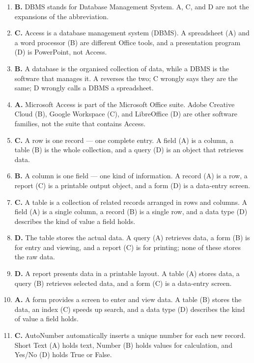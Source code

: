 \begin{enumerate}[label=\textbf{Q\arabic*.}, leftmargin=*]
\item \textbf{B.} DBMS stands for Database Management System. A, C, and D are
  not the expansions of the abbreviation.
\item \textbf{C.} Access is a database management system (DBMS). A
  spreadsheet (A) and a word processor (B) are different Office tools, and a
  presentation program (D) is PowerPoint, not Access.
\item \textbf{B.} A database is the organised collection of data, while a
  DBMS is the software that manages it. A reverses the two; C wrongly says
  they are the same; D wrongly calls a DBMS a spreadsheet.
\item \textbf{A.} Microsoft Access is part of the Microsoft Office suite.
  Adobe Creative Cloud (B), Google Workspace (C), and LibreOffice (D) are
  other software families, not the suite that contains Access.
\item \textbf{C.} A row is one record --- one complete entry. A field (A) is
  a column, a table (B) is the whole collection, and a query (D) is an
  object that retrieves data.
\item \textbf{B.} A column is one field --- one kind of information. A record
  (A) is a row, a report (C) is a printable output object, and a form (D) is
  a data-entry screen.
\item \textbf{C.} A table is a collection of related records arranged in rows
  and columns. A field (A) is a single column, a record (B) is a single row,
  and a data type (D) describes the kind of value a field holds.
\item \textbf{D.} The table stores the actual data. A query (A) retrieves
  data, a form (B) is for entry and viewing, and a report (C) is for
  printing; none of these stores the raw data.
\item \textbf{D.} A report presents data in a printable layout. A table (A)
  stores data, a query (B) retrieves selected data, and a form (C) is a
  data-entry screen.
\item \textbf{A.} A form provides a screen to enter and view data. A table
  (B) stores the data, an index (C) speeds up search, and a data type (D)
  describes the kind of value a field holds.
\item \textbf{C.} AutoNumber automatically inserts a unique number for each
  new record. Short Text (A) holds text, Number (B) holds values for
  calculation, and Yes/No (D) holds True or False.

\end{enumerate}
